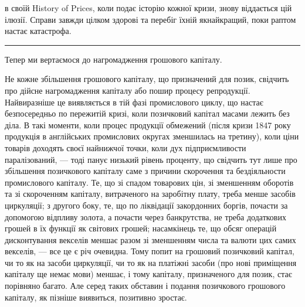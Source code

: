 \parcont{}  %
в своїй History of Prices, коли подає історію кожної кризи, знову віддається цій
ілюзії. Справи завжди цілком здорові та перебіг їхній якнайкращий, поки раптом
настає катастрофа.

\pfbreak

Тепер ми вертаємося до нагромадження грошового капіталу.

Не кожне збільшення грошового капіталу, що призначений для позик, свідчить
про дійсне нагромадження капіталу або пошир процесу репродукції. Найвиразніше
це виявляється в тій фазі промислового циклу, що настає безпосередньо по пережитій
кризі, коли позичковий капітал масами лежить без діла. В такі моменти,
коли процес продукції обмежений (після кризи 1847 року продукція в англійських
промислових округах зменшилась на третину), коли ціни товарів доходять
своєї найнижчої точки, коли дух підприємливости паралізований, — тоді панує
низький рівень проценту, що свідчить тут лише про збільшення позичкового
капіталу саме з причини скорочення та бездіяльности промислового капіталу.
Те, що зі спадом товарових цін, зі зменшенням оборотів та зі скороченням
капіталу, витраченого на заробітну плату, треба менше засобів циркуляції;
з другого боку, те, що по ліквідації закордонних боргів, почасти за допомогою
відпливу золота, а почасти через банкрутства, не треба додаткових грошей
в їх функції як світових грошей; насамкінець те, що обсяг операцій дисконтування
векселів меншає разом зі зменшенням числа та валюти цих самих
векселів, — все це є річ очевидна. Тому попит на грошовий позичковий капітал,
чи то як на засоби циркуляції, чи то як на платіжні засоби (про нові приміщення
капіталу ще немає мови) меншає, і тому капіталу, призначеного для позик,
стає порівняно багато. Але серед таких обставин і подання позичкового грошового
капіталу, як пізніше виявиться, позитивно зростає.

